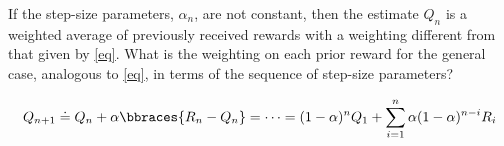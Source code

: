 
\begin{exercise}[Exercise 2.4]

If the step-size parameters, $\alpha_n$, are not constant, then the estimate $Q_n$ is a weighted average of previously received rewards with a weighting different from that given by \eqref{eq}.
What is the weighting on each prior reward for the general case, analogous to \eqref{eq}, in terms of the sequence of step-size parameters?

\begin{align} \label{eq}
    Q_{n+1}
    \doteq
    Q_n + \alpha \bbraces{R_n - Q_n}
    = \cdots =
    (1 - \alpha)^n Q_1
    +
    \sum_{i=1}^n
        \alpha (1 - \alpha)^{n-i} R_i
\end{align}

\end{exercise}


